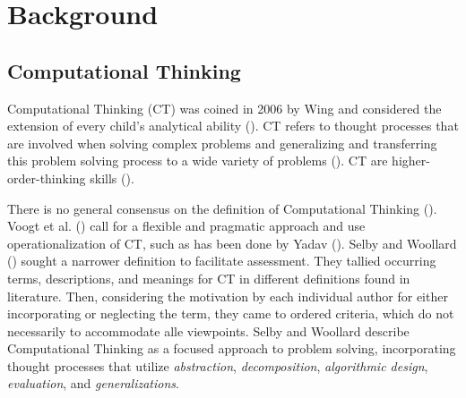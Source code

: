 
\section{Background}\label{sec:background}






\subsection{Computational Thinking}
Computational Thinking (CT) was coined in 2006 by Wing and considered the extension of every child's analytical ability (\cite{Wing2006}). CT refers to thought processes that are involved when solving complex problems and generalizing and transferring this problem solving process to a wide variety of problems (\cite{voogt2015computational}). CT are higher-order-thinking skills  (\cite{Yadav2017CTteacherEd}).



There is no general consensus on the definition of Computational Thinking (\cite{Yadav2015}). Voogt et al. (\cite{voogt2015computational}) call for a flexible and pragmatic approach and use operationalization of CT, such as has been done by Yadav (\cite{Yadav2015}). Selby and Woollard (\cite{selby2013computational}) sought a narrower definition to facilitate assessment. They tallied occurring terms, descriptions, and meanings for CT in different definitions found in literature. Then, considering the motivation by each individual author for either incorporating or neglecting the term, they came to ordered criteria, which do not necessarily to accommodate alle viewpoints. Selby and Woollard describe Computational Thinking as a focused approach to problem solving, incorporating thought processes that utilize \emph{abstraction}, \emph{decomposition}, \emph{algorithmic design}, \emph{evaluation}, and \emph{generalizations}.
%

